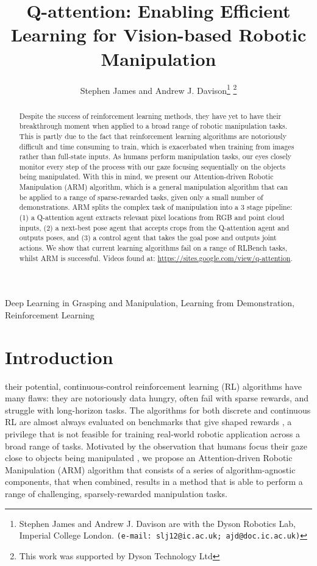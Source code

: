 \documentclass[letterpaper, 10 pt, journal, twoside]{IEEEtran}
\title{Q-attention: Enabling Efficient Learning for Vision-based Robotic Manipulation}
\author{Stephen James and Andrew J. Davison\thanks{Stephen James and Andrew J. Davison are with the Dyson Robotics Lab, Imperial College London. {\tt\footnotesize(e-mail: slj12@ic.ac.uk; ajd@doc.ic.ac.uk)}}
\thanks{This work was supported by Dyson Technology Ltd}
}
\begin{document}
\maketitle

\begin{abstract}
Despite the success of reinforcement learning methods, they have yet to have their breakthrough moment when applied to a broad range of robotic manipulation tasks. This is partly due to the fact that reinforcement learning algorithms are notoriously difficult and time consuming to train, which is exacerbated when training from images rather than full-state inputs. As humans perform manipulation tasks, our eyes closely monitor every step of the process with our gaze focusing sequentially on the objects being manipulated. With this in mind, we present our Attention-driven Robotic Manipulation (ARM) algorithm, which is a general manipulation algorithm that can be applied to a range of sparse-rewarded tasks, given only a small number of demonstrations. ARM splits the complex task of manipulation into a 3 stage pipeline: (1) a Q-attention agent extracts relevant pixel locations from RGB and point cloud inputs, (2) a next-best pose agent that accepts crops from the Q-attention agent and outputs poses, and (3) a control agent that takes the goal pose and outputs joint actions. We show that current learning algorithms fail on a range of RLBench tasks, whilst ARM is successful. Videos found at: \url{https://sites.google.com/view/q-attention}.
\end{abstract}

\begin{IEEEkeywords}
Deep Learning in Grasping and Manipulation, Learning from Demonstration, Reinforcement Learning
\end{IEEEkeywords}

\section{Introduction}

 their potential, continuous-control reinforcement learning (RL) algorithms have many flaws: they are notoriously data hungry, often fail with sparse rewards, and struggle with long-horizon tasks. The algorithms for both discrete and continuous RL are almost always evaluated on benchmarks that give shaped rewards \cite{brockman2016openai, tassa2018deepmind}, a privilege that is not feasible for training real-world robotic application across a broad range of tasks. Motivated by the observation that humans focus their gaze close to objects being manipulated \cite{land1999roles}, we propose an Attention-driven Robotic Manipulation (ARM) algorithm that consists of a series of algorithm-agnostic components, that when combined, results in a method that is able to perform a range of challenging, sparsely-rewarded manipulation tasks. 
\end{document}
